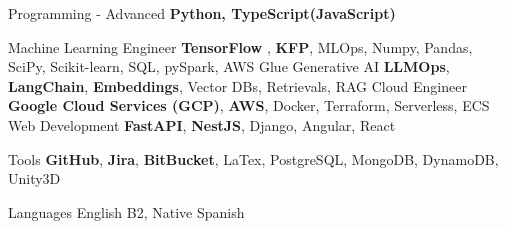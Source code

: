 \cvskill
{Programming - Advanced} %
{\textbf{Python, TypeScript(JavaScript)}} %

\cvskill
{Machine Learning Engineer}
{\textbf{TensorFlow} , \textbf{KFP}, MLOps, Numpy, Pandas, SciPy, Scikit-learn, SQL, pySpark, AWS Glue}
\cvskill
{Generative AI}
{\textbf{LLMOps}, \textbf{LangChain}, \textbf{Embeddings}, Vector DBs,  Retrievals, RAG}
\cvskill
{Cloud Engineer}
{\textbf{Google Cloud Services (GCP)}, \textbf{AWS}, Docker, Terraform, Serverless, ECS}
\cvskill
{Web Development} %
{\textbf{FastAPI}, \textbf{NestJS}, Django, Angular, React} %

\cvskill
{Tools}
{\textbf{GitHub}, \textbf{Jira}, \textbf{BitBucket}, LaTex, PostgreSQL, MongoDB, DynamoDB, Unity3D}

\cvskill
{Languages} %
{English B2, Native Spanish} %

